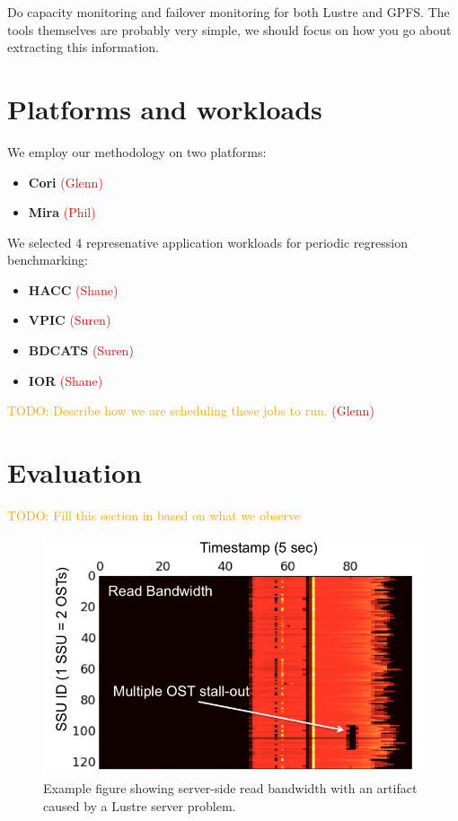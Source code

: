 \documentclass[conference,10pt,compsocconf]{IEEEtran}
\newcommand{\assign}[1]{\textcolor{red}{(#1)}}
\newcommand{\todo}[1]{\textcolor{Orange}{TODO: #1}}
\begin{document}
Do capacity monitoring and failover monitoring for both Lustre and GPFS.  The
tools themselves are probably very simple, we should focus on how you go
about extracting this information.

\section{Platforms and workloads}

We employ our methodology on two platforms:

\begin{itemize}
\item \textbf{Cori} \assign{Glenn}
\item \textbf{Mira} \assign{Phil}
\end{itemize}

We selected 4 represenative application workloads for periodic regression
benchmarking:

\begin{itemize}
\item \textbf{HACC} \assign{Shane}
\item \textbf{VPIC} \assign{Suren}
\item \textbf{BDCATS} \assign{Suren}
\item \textbf{IOR} \assign{Shane}
\end{itemize}

\todo{Describe how we are scheduling these jobs to run.} \assign{Glenn}

\section{Evaluation}

\todo{Fill this section in based on what we observe}

\begin{figure}[t]
\centering
\includegraphics[width=0.8\columnwidth]{figs/example.png}
\caption{Example figure showing server-side read bandwidth with an artifact
caused by a Lustre server problem.}
\label{fig:example}
\vspace{-.1in}
\end{figure}
\end{document}
